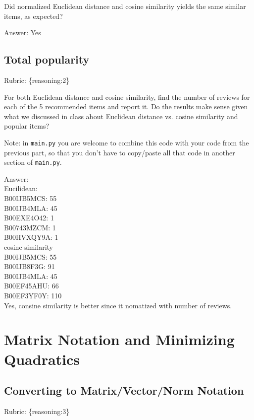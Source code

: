 \documentclass{article}
\def\rubric#1{\gre{Rubric: \{#1\}}}{}
\def\ans#1{\par\gre{Answer: #1}}
\def\blu#1{{\color{blu}#1}}
\def\gre#1{{\color{gre}#1}}
\begin{document}
\blu{Did normalized Euclidean distance and cosine similarity yields the same similar items, as expected?}
\ans{Yes}

\subsection{Total popularity}
\rubric{reasoning:2}

\blu{For both Euclidean distance and cosine similarity, find the number of reviews for each of the 5 recommended items and report it. Do the results make sense given what we discussed in class about Euclidean distance vs. cosine similarity and popular items?}

Note: in \texttt{main.py} you are welcome to combine this code with your code from the previous part, so that you don't have to copy/paste all that code in another section of \texttt{main.py}.
\ans{\\
	Eucilidean:\\
	B00IJB5MCS: 55\\
	B00IJB4MLA: 45\\
	B00EXE4O42: 1\\
	B00743MZCM: 1\\
	B00HVXQY9A: 1\\
	cosine similarity\\
B00IJB5MCS: 55\\
B00IJB8F3G: 91\\
B00IJB4MLA: 45\\
B00EF45AHU: 66\\
B00EF3YF0Y: 110\\
Yes, consine similarity is better since it nomatized with number of reviews.}



\section{Matrix Notation and Minimizing Quadratics}


\subsection{Converting to Matrix/Vector/Norm Notation}
\rubric{reasoning:3}
\end{document}
